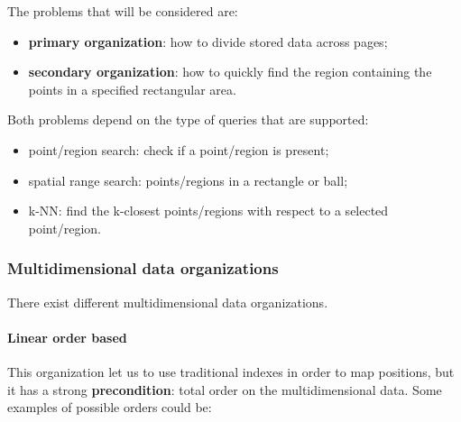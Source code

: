 The problems that will be considered are:

\begin{itemize}
    \item \textbf{primary organization}: how to divide stored data across pages;
    \item \textbf{secondary organization}: how to quickly find the region containing the points in a specified rectangular area. 
\end{itemize}

Both problems depend on the type of queries that are supported:

\begin{itemize}
    \item point/region search: check if a point/region is present;
    \item spatial range search: points/regions in a rectangle or ball;
    \item k-NN: find the k-closest points/regions with respect to a selected point/region.
\end{itemize}

\subsubsection{Multidimensional data organizations}
There exist different multidimensional data organizations.

\paragraph{Linear order based}
This organization let us to use traditional indexes in order to map positions, but it has a strong \textbf{precondition}: total order on the multidimensional data. Some examples of possible orders could be:

